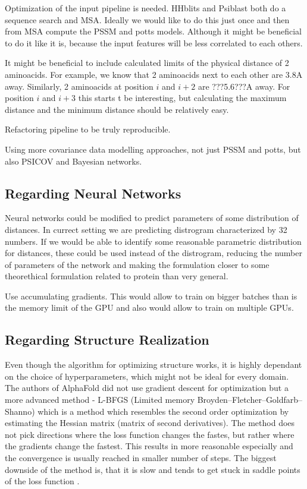 Optimization of the input pipeline is needed.
HHblits and Psiblast both do a sequence search and MSA.
Ideally we would like to do this just once and then from MSA compute the PSSM and potts models.
Although it might be beneficial to do it like it is, because the input features will be less correlated to each others.

It might be beneficial to include calculated limits of the physical distance of 2 aminoacids.
For example, we know that 2 aminoacids next to each other are 3.8A away.
Similarly, 2 aminoacids at position $i$ and $i+2$ are ???5.6???A away.
For position $i$ and $i+3$ this starts t be interesting, but calculating the maximum distance and the minimum distance should be relatively easy.

Refactoring pipeline to be truly reproducible.

Using more covariance data modelling approaches, not just PSSM and potts, but also PSICOV and Bayesian networks.

\subsection{Regarding Neural Networks}
Neural networks could be modified to predict parameters of some distribution of distances.
In currect setting we are predicting distrogram characterized by 32 numbers.
If we would be able to identify some reasonable parametric distribution for distances, these could be used instead of the distrogram, reducing the number of parameters of the network and making the formulation closer to some theorethical formulation related to protein than very general.

Use accumulating gradients. This would allow to train on bigger batches than is the memory limit of the GPU and also would allow to train on multiple GPUs.

\subsection{Regarding Structure Realization}

Even though the algorithm for optimizing structure works, it is highly dependant on the choice of hyperparameters, which might not be ideal for every domain. The authors of AlphaFold did not use gradient descent for optimization but a more advanced method - L-BFGS (Limited memory Broyden–Fletcher–Goldfarb–Shanno) which is a method which resembles the second order optimization by estimating the Hessian matrix (matrix of second derivatives). The method does not pick directions where the loss function changes the fastes, but rather where the gradients change the fastest. This results in more reasonable especially and the convergence is usually reached in smaller number of steps. The biggest downside of the method is, that it is slow and tends to get stuck in saddle points of the loss function \cite{nn_dl}.